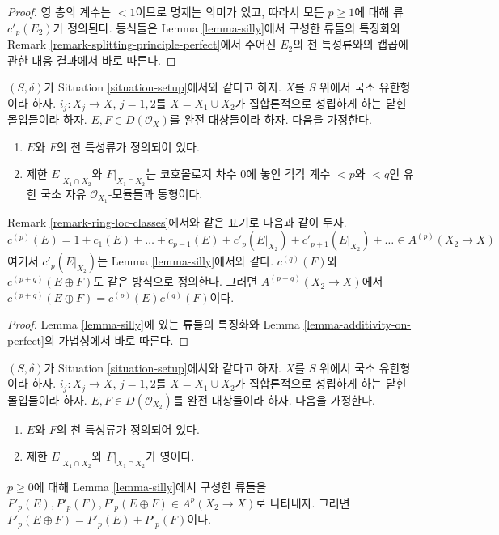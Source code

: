 \begin{proof}
영 층의 계수는 $< 1$이므로 명제는 의미가 있고, 따라서 모든
$p \geq 1$에 대해 류 $c'_p(E_2)$가 정의된다. 등식들은 Lemma
\ref{lemma-silly}에서 구성한 류들의 특징화와 Remark
\ref{remark-splitting-principle-perfect}에서 주어진 $E_2$의 천 특성류와의
캡곱에 관한 대응 결과에서 바로 따른다.
\end{proof}

\begin{lemma}
\label{lemma-silly-sum-c}
$(S, \delta)$가 Situation \ref{situation-setup}에서와 같다고 하자.
$X$를 $S$ 위에서 국소 유한형이라 하자. $i_j : X_j \to X$,
$j = 1, 2$를 $X = X_1 \cup X_2$가 집합론적으로 성립하게 하는 닫힌
몰입들이라 하자. $E, F \in D(\mathcal{O}_X)$를 완전 대상들이라 하자.
다음을 가정한다.
\begin{enumerate}
\item $E$와 $F$의 천 특성류가 정의되어 있다.
\item 제한 $E|_{X_1 \cap X_2}$와 $F|_{X_1 \cap X_2}$는 코호몰로지
차수 $0$에 놓인 각각 계수 $< p$와 $< q$인 유한 국소 자유
$\mathcal{O}_{X_1}$-모듈들과 동형이다.
\end{enumerate}
Remark \ref{remark-ring-loc-classes}에서와 같은 표기로 다음과 같이 두자.
$$
c^{(p)}(E) = 1 + c_1(E) + \ldots + c_{p - 1}(E) +
c'_p(E|_{X_2}) + c'_{p + 1}(E|_{X_2}) + \ldots \in A^{(p)}(X_2 \to X)
$$
여기서 $c'_p(E|_{X_2})$는 Lemma \ref{lemma-silly}에서와 같다.
$c^{(q)}(F)$와 $c^{(p + q)}(E \oplus F)$도 같은 방식으로 정의한다.
그러면 $A^{(p + q)}(X_2 \to X)$에서
$c^{(p + q)}(E \oplus F) = c^{(p)}(E)c^{(q)}(F)$이다.
\end{lemma}

\begin{proof}
Lemma \ref{lemma-silly}에 있는 류들의 특징화와 Lemma
\ref{lemma-additivity-on-perfect}의 가법성에서 바로 따른다.
\end{proof}

\begin{lemma}
\label{lemma-silly-sum-P}
$(S, \delta)$가 Situation \ref{situation-setup}에서와 같다고 하자.
$X$를 $S$ 위에서 국소 유한형이라 하자. $i_j : X_j \to X$,
$j = 1, 2$를 $X = X_1 \cup X_2$가 집합론적으로 성립하게 하는 닫힌
몰입들이라 하자. $E, F \in D(\mathcal{O}_{X_2})$를 완전 대상들이라 하자.
다음을 가정한다.
\begin{enumerate}
\item $E$와 $F$의 천 특성류가 정의되어 있다.
\item 제한 $E|_{X_1 \cap X_2}$와 $F|_{X_1 \cap X_2}$가 영이다.
\end{enumerate}
$p \geq 0$에 대해 Lemma \ref{lemma-silly}에서 구성한 류들을
$P'_p(E), P'_p(F), P'_p(E \oplus F) \in A^p(X_2 \to X)$로 나타내자.
그러면 $P'_p(E \oplus F) = P'_p(E) + P'_p(F)$이다.
\end{lemma}

